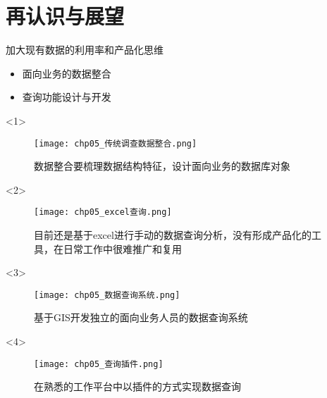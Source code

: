 

\section{再认识与展望}

\begin{frame}[t]{加大现有数据的利用率和产品化思维}
\begin{itemize}
\item<1-> 面向业务的数据整合
\item<2-> 查询功能设计与开发
\end{itemize}

\begin{overlayarea}{\textwidth}{\textheight}
  \begin{onlyenv}<1>
\begin{figure}
  \centering
  \texttt{[image: chp05\_传统调查数据整合.png]}
  \caption{数据整合要梳理数据结构特征，设计面向业务的数据库对象}
\end{figure}
  \end{onlyenv}

\vspace{-15pt}
  \begin{onlyenv}<2>
\begin{figure}
  \centering
  \texttt{[image: chp05\_excel查询.png]}
  \caption{目前还是基于excel进行手动的数据查询分析，没有形成产品化的工具，在日常工作中很难推广和复用}
\end{figure}
  \end{onlyenv}

  \begin{onlyenv}<3>
\begin{figure}
  \centering
  \texttt{[image: chp05\_数据查询系统.png]}
  \caption{基于GIS开发独立的面向业务人员的数据查询系统}
\end{figure}
  \end{onlyenv}

  \begin{onlyenv}<4>
\begin{figure}
  \centering
  \texttt{[image: chp05\_查询插件.png]}
  \caption{在熟悉的工作平台中以插件的方式实现数据查询}
\end{figure}
  \end{onlyenv}
\end{overlayarea}
\end{frame}

